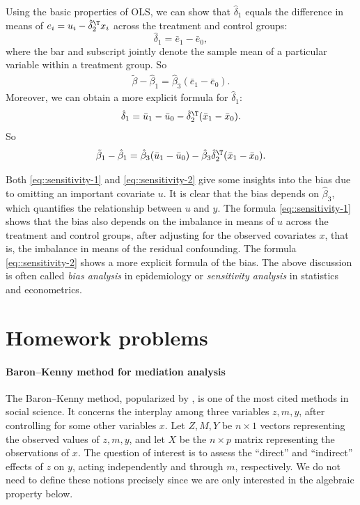 Using the basic properties of OLS, we can show that $\hat{\delta}_1$ equals the difference in means of $e_i =  u_i -   \hat{\delta}_2^{\T} x_i$ across the treatment and control groups:
$$
\hat{\delta}_1 = \bar{e}_1 - \bar{e}_0,
$$
where the bar and subscript jointly denote the sample mean of a particular variable within a treatment group.
So
\begin{eqnarray} \label{eq::sensitivity-1}
\tilde{\beta} - \hat{\beta}_1 =  \hat{\beta}_3  ( \bar{e}_1 - \bar{e}_0).
\end{eqnarray} 
Moreover, we can obtain a more explicit formula for $\hat{\delta}_1$: 
$$
\hat{\delta}_1 = \bar{u}_1 - \bar{u}_0 -  \hat{\delta}_2^{\T}  ( \bar{x}_1 - \bar{x}_0 ).
$$
So
\begin{eqnarray} \label{eq::sensitivity-2}
\tilde{\beta}_1 - \hat{\beta}_1 =  \hat{\beta}_3(\bar{u}_1 - \bar{u}_0) -  \hat{\beta}_3\hat{\delta}_2^{\T}  ( \bar{x}_1 - \bar{x}_0 ).
\end{eqnarray} 

Both \eqref{eq::sensitivity-1} and \eqref{eq::sensitivity-2} give some insights into the bias due to omitting an important covariate $u$. It is clear that the bias depends on $ \hat{\beta}_3$, which quantifies the relationship between $u$ and $y$. The formula \eqref{eq::sensitivity-1} shows that the bias also depends on the imbalance in means of $u$ across the treatment and control groups, after adjusting for the observed covariates $x$, that is, the imbalance in means of the residual confounding. The formula \eqref{eq::sensitivity-2} shows a more explicit formula of the bias. The above discussion is often called {\it bias analysis} in epidemiology or {\it sensitivity analysis} in statistics and econometrics. 




\section{Homework problems}


\paragraph{Baron--Kenny method for mediation analysis}
\label{hw07::baron-kenney}

The Baron--Kenny method, popularized by \citet{baron1986moderator}, is one of the most cited methods in social science. 
It concerns the interplay among three variables $z, m, y$, after controlling for some other variables $x$. Let $Z, M, Y$ be  $n\times 1$ vectors representing the observed values of $z, m, y$, and let $X$ be the $n\times p$ matrix representing the observations of $x$. The question of interest is to assess the ``direct'' and ``indirect'' effects of $z$ on $y$, acting independently and through $m$, respectively. We do not need to define these notions precisely since we are only interested in the algebraic property below. 


